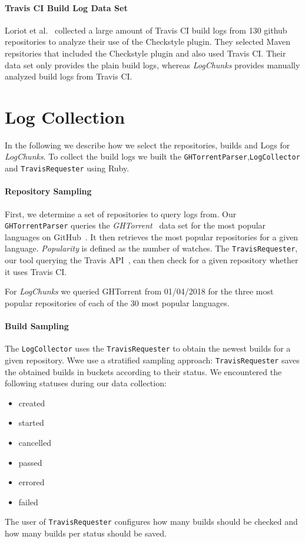 \documentclass[\myrootdir/main.tex]{subfiles}
\begin{document}
\paragraph{Travis CI Build Log Data Set}
Loriot et al.~\cite{loriot2019dataset, loriot2019styler} collected a large amount of Travis CI build logs from 130 github repositories to analyze their use of the Checkstyle plugin.
They selected Maven repsitories that included the Checkstyle plugin and also used Travis CI.
Their data set only provides the plain build logs, whereas \emph{LogChunks} provides manually analyzed build logs from Travis CI.

\section{Log Collection}
In the following we describe how we select the repositories, builds and Logs for \emph{LogChunks}.
To collect the build logs we built the  \texttt{GHTorrentParser},\texttt{LogCollector} and \texttt{TravisRequester} using Ruby.

\paragraph{Repository Sampling}
First, we determine a set of repositories to query logs from.
Our \texttt{GHTorrentParser} queries the \emph{GHTorrent}~\cite{gousios2013ghtorrent} data set for the most popular languages on GitHub~\cite{github2019website}.
It then retrieves the most popular repositories for a given language.
\emph{Popularity} is defined as the number of watches.
The \texttt{TravisRequester}, our tool querying the Travis API~\cite{travisci2019apidoc}, can then check for a given repository whether it uses Travis CI.

For \emph{LogChunks} we queried GHTorrent from 01/04/2018 for the three most popular repositories of each of the 30 most popular languages.

\paragraph{Build Sampling}
The \texttt{LogCollector} uses the \texttt{TravisRequester} to obtain the newest builds for a given repository.
Wwe use a stratified sampling approach: \texttt{TravisRequester} saves the obtained builds in buckets according to their status.
We encountered the following statuses during our data collection:
\begin{multicols}{3}
\begin{itemize}
	\item created
	\item started
	\item cancelled
	\item passed
	\item errored
	\item failed
\end{itemize}
\end{multicols}
The user of \texttt{TravisRequester} configures how many builds should be checked and how many builds per status should be saved.
\end{document}
